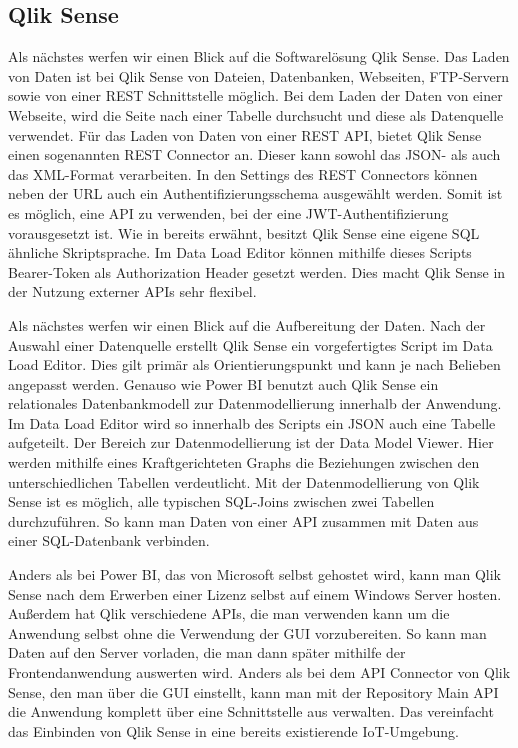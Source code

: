 \subsection{Qlik Sense}
\label{subsec:qliksense}
Als nächstes werfen wir einen Blick auf die Softwarelösung Qlik Sense.
Das Laden von Daten ist bei Qlik Sense von Dateien, Datenbanken, Webseiten, FTP-Servern sowie von einer
REST Schnittstelle möglich. Bei dem Laden der Daten von einer Webseite, wird die Seite nach einer Tabelle
durchsucht und diese als Datenquelle verwendet.\cite[S. 17]{QlikSenseCookbook} Für das Laden von Daten von
einer REST API, bietet Qlik Sense einen sogenannten REST Connector an. Dieser kann sowohl das JSON- als auch
das XML-Format verarbeiten. In den Settings des REST Connectors können neben der URL auch ein
Authentifizierungsschema ausgewählt werden.\cite[S. 23]{QlikSenseCookbook} Somit ist es möglich,
eine API zu verwenden, bei der eine JWT-Authentifizierung vorausgesetzt ist. Wie in 
bereits erwähnt, besitzt Qlik Sense eine eigene SQL ähnliche Skriptsprache. Im Data Load Editor
können mithilfe dieses Scripts Bearer-Token als Authorization Header gesetzt werden. Dies macht Qlik
Sense in der Nutzung externer APIs sehr flexibel.

Als nächstes werfen wir einen Blick auf die Aufbereitung der Daten. Nach der Auswahl einer Datenquelle
erstellt Qlik Sense ein vorgefertigtes Script im Data Load Editor. Dies gilt primär als Orientierungspunkt
und kann je nach Belieben angepasst werden. Genauso wie Power BI benutzt auch Qlik Sense ein relationales
Datenbankmodell zur Datenmodellierung innerhalb der Anwendung. Im Data Load Editor wird so innerhalb des
Scripts ein JSON auch eine Tabelle aufgeteilt. Der Bereich zur Datenmodellierung ist der Data Model Viewer.
Hier werden mithilfe eines Kraftgerichteten Graphs die Beziehungen zwischen den unterschiedlichen
Tabellen verdeutlicht. Mit der Datenmodellierung von Qlik Sense ist es möglich, alle typischen SQL-Joins
zwischen zwei Tabellen durchzuführen. So kann man Daten von einer API zusammen mit Daten aus einer SQL-Datenbank
verbinden.  

Anders als bei Power BI, das von Microsoft selbst gehostet wird, kann man Qlik Sense nach dem Erwerben
einer Lizenz selbst auf einem Windows Server hosten. Außerdem hat Qlik verschiedene APIs, die man
verwenden kann um die Anwendung selbst ohne die Verwendung der GUI vorzubereiten. So kann man Daten
auf den Server vorladen, die man dann später mithilfe der Frontendanwendung auswerten wird. Anders als bei
dem API Connector von Qlik Sense, den man über die GUI einstellt, kann man mit der Repository Main API
die Anwendung komplett über eine Schnittstelle aus verwalten.\cite{QlikSenseRepositoryMainAPI}
Das vereinfacht das Einbinden von Qlik Sense in eine bereits existierende IoT-Umgebung.

